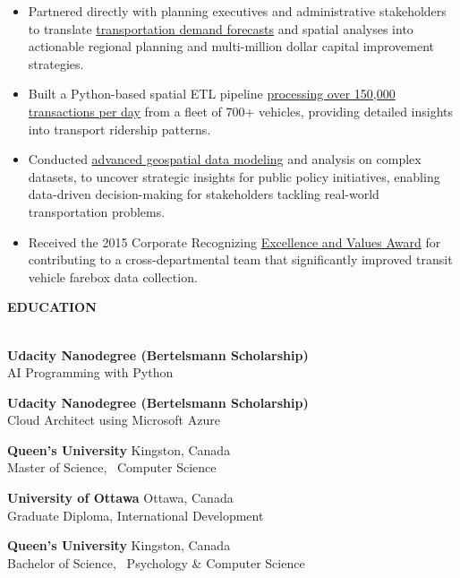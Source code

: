 \documentclass[letterpaper]{article}
\newcommand{\lineunder} {
        \vspace*{-8pt} \\
        \hspace*{-18pt} \hrulefill \\
    }
\newcommand{\header} [1] {
        \vspace{9pt}
        {\hspace*{-18pt}\vspace*{6pt} \large \textbf {#1}}
        \vspace*{-6pt} \lineunder
        \vspace{2pt}
    }
\newenvironment{jobtasklist}
        {
            \vspace{-12pt}
            \begin{itemize} \itemsep 0pt
        }{
            \end{itemize}
            \vspace{-3pt}
        }
\newcommand{\university}[3]{
        \textbf{#1}  %
        \hfill #2\\  %
        #3\\         %
        \vspace{2mm}
    }
\newcommand{\impt}[1]{\uline{#1}}
\begin{document}
\begin{jobtasklist}
    \item Partnered directly with planning executives and administrative stakeholders to translate
            \impt{transportation demand forecasts} and spatial analyses into actionable regional planning
            and multi-million dollar capital improvement strategies.
    \item Built a Python-based spatial ETL pipeline
            \impt{processing over 150,000 transactions per day}
            from a fleet of 700+ vehicles, providing detailed insights into transport ridership patterns.
    \item Conducted \impt{advanced geospatial data modeling} and analysis on complex datasets,
            to uncover strategic insights for public policy initiatives,
            enabling data-driven decision-making for stakeholders tackling real-world transportation problems.
    \item Received the 2015 Corporate Recognizing \impt{Excellence and Values Award}
            for contributing to a cross-departmental team that significantly
            improved transit vehicle farebox data collection.
\end{jobtasklist}


\vspace{25pt}

\header{EDUCATION}
    \university
        {Udacity Nanodegree (Bertelsmann Scholarship)}
        {}
        {AI Programming with Python}
    \university
        {Udacity Nanodegree (Bertelsmann Scholarship)}
        {}
        {Cloud Architect using Microsoft Azure}
    \university
        {Queen's University}
        {Kingston, Canada}
        {Master of Science, ~Computer Science}

    \university
        {University of Ottawa}
        {Ottawa, Canada}
        {Graduate Diploma, International Development}

    \university
        {Queen's University}
        {Kingston, Canada}
        {Bachelor of Science, ~Psychology \& Computer Science}
\end{document}

